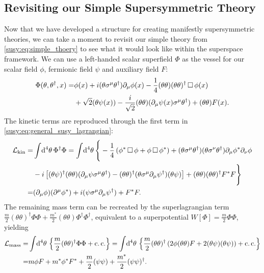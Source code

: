 \documentclass[../main.tex]{subfiles}
\begin{document}
\subsection{Revisiting our Simple Supersymmetric Theory}
Now that we have developed a structure for creating manifestly supersymmetric theories, we can take a moment to revisit our simple theory from \cref{susy:eq:simple_thoery} to see what it would look like within the superspace framework.
We can use a left-handed scalar superfield \(\Phi\) as the vessel for our scalar field \(\phi\), fermionic field \(\psi\) and auxiliary field \(F\):
\begin{align}
  \nonumber
  \Phi(\theta, \theta^\dagger, x) = & \phi(x) + i(\theta\sigma\^\mu \theta^\dagger) \partial_\mu \phi(x) - \frac{1}{4} (\theta\theta)(\theta\theta)^\dagger \dA \phi(x)      \\
                                    & + \sqrt{2}(\theta \psi(x)) - \frac{i}{\sqrt{2}} (\theta\theta) (\partial_\mu \psi(x) \sigma\^\mu \theta^\dagger) + (\theta\theta)F(x).
\end{align}
The kinetic terms are reproduced through the first term in \cref{susy:eq:general_susy_lagrangian}:
\begin{align}
  \nonumber
  \L_\text{kin} = & \integral{^4\theta} \Phi^\dagger \Phi = \integral{^4\theta} \Bigg\{-\frac{1}{4}\pclosed{\phi^\ast \dA \phi + \phi \dA \phi^\ast} + (\theta \sigma\^\mu \theta^\dagger)(\theta \sigma\^\nu \theta^\dagger) \partial_\mu\phi^\ast \partial_\nu\phi \\
  \nonumber
                  & -i \bclosed{(\theta \psi)^\dagger (\theta\theta) (\partial_\mu \psi \sigma\^\mu \theta^\dagger) - (\theta\theta)^\dagger (\theta \sigma\^\mu \partial_\mu \psi^\dagger) (\theta \psi)} + (\theta\theta)(\theta\theta)^\dagger F^\ast F   \Bigg\} \\
  =               & (\partial_\mu \phi) (\partial^\mu\phi^\ast) + i(\psi \sigma\^\mu \partial_\mu \psi^\dagger) + F^\ast F.
\end{align}
The remaining mass term can be recreated by the superlagrangian term \(\frac{m}{2} (\theta\theta)^\dagger \Phi\Phi + \frac{m^\ast}{2} (\theta\theta) \Phi^\dagger\Phi^\dagger\), equivalent to a superpotential \(W[\Phi] = \frac{m}{2}\Phi \Phi\), yielding
\begin{align}
  \nonumber
  \mathcal{L}_\text{mass} = & \int \!\mathrm{d}^4\theta\, \left\{\frac{m}{2} (\theta\theta)^\dagger \Phi\Phi + \operatorname{c.c.}\right\} = \int \!\mathrm{d}^4\theta\, \left\{\frac{m}{2} (\theta\theta)^\dagger \left(2\phi (\theta\theta) F + 2(\theta\psi)(\theta\psi)\right) + \operatorname{c.c.}\right\} \\
  =                & m \phi F + m^\ast \phi^\ast F^\ast + \frac{m}{2}(\psi\psi) + \frac{m^\ast}{2} (\psi\psi)^\dagger.
\end{align}
\end{document}
